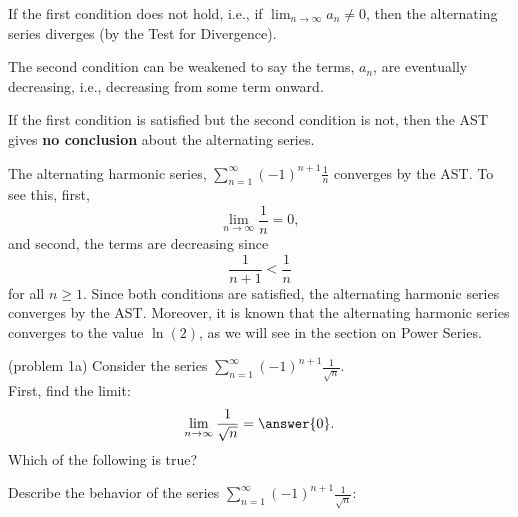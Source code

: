 \documentclass[handout]{ximera}
\begin{document}
\begin{remark} If the first condition does not hold, i.e., if 
$\displaystyle{\lim_{n\to\infty} a_n \neq 0}$, 
then the alternating series diverges (by the Test for Divergence).
\end{remark}

\begin{remark}
The second condition can be weakened to say the terms, $a_n$, are eventually decreasing, i.e., decreasing from some term onward.
\end{remark}

\begin{remark} 
If the first condition is satisfied but the second condition is not, then the AST gives \textbf{no conclusion} about the alternating series.
\end{remark}

\begin{example}[example 1] The alternating harmonic series, 
$\displaystyle{\sum_{n=1}^\infty (-1)^{n+1} \frac{1}{n}}$ converges by the AST. 
To see this, first, 
\[
\lim_{n\to\infty} \frac{1}{n} = 0,
\]
and second,
the terms are decreasing since 
\[
\frac{1}{n+1} < \frac{1}{n}
\]
for all $n \geq 1$. Since both conditions are satisfied, the alternating harmonic series converges by the AST.
Moreover, it is known that the alternating harmonic series converges to the value $\ln(2)$, as we will see in the section on Power Series.
\end{example}

\begin{problem}(problem 1a)
Consider the series $\displaystyle{\sum_{n=1}^\infty (-1)^{n+1} \frac{1}{\sqrt n}}$.\\
First, find the limit:
\[
\lim_{n\to\infty} \frac{1}{\sqrt n} = \answer{0}.
\]
Which of the following is true?
\begin{multipleChoice}
\end{multipleChoice}


Describe the behavior of the series $\displaystyle{\sum_{n=1}^\infty (-1)^{n+1} \frac{1}{\sqrt n}:}$
\begin{multipleChoice}
\end{multipleChoice}

\end{problem}
\end{document}
